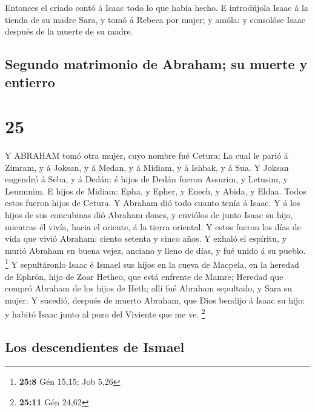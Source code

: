  Entonces el criado contó á Isaac todo lo que había hecho.
 E introdújola Isaac á la tienda de su madre Sara, y tomó á
Rebeca por mujer; y amóla: y consolóse Isaac después de la muerte de su
madre.

\hypertarget{segundo-matrimonio-de-abraham-su-muerte-y-entierro}{%
\subsection{Segundo matrimonio de Abraham; su muerte y
entierro}\label{segundo-matrimonio-de-abraham-su-muerte-y-entierro}}

\hypertarget{section-24}{%
\section{25}\label{section-24}}

 Y ABRAHAM tomó otra mujer, cuyo nombre fué Cetura;
 La cual le parió á Zimram, y á Joksan, y á Medan, y á
Midiam, y á Ishbak, y á Sua.  Y Joksan engendró á Seba, y á
Dedán: é hijos de Dedán fueron Assurim, y Letusim, y Leummim.
 E hijos de Midiam: Epha, y Epher, y Enech, y Abida, y
Eldaa. Todos estos fueron hijos de Cetura.  Y Abraham dió
todo cuanto tenía á Isaac.  Y á los hijos de sus concubinas
dió Abraham dones, y enviólos de junto Isaac su hijo, mientras él vivía,
hacia el oriente, á la tierra oriental.  Y estos fueron los
días de vida que vivió Abraham: ciento setenta y cinco años.
 Y exhaló el espíritu, y murió Abraham en buena vejez,
anciano y lleno de días, y fué unido á su pueblo. \footnote{\textbf{25:8}
  Gén 15,15; Job 5,26}  Y sepultáronlo Isaac é Ismael sus
hijos en la cueva de Macpela, en la heredad de Ephrón, hijo de Zoar
Hetheo, que está enfrente de Mamre;  Heredad que compró
Abraham de los hijos de Heth; allí fué Abraham sepultado, y Sara su
mujer.  Y sucedió, después de muerto Abraham, que Dios
bendijo á Isaac su hijo: y habitó Isaac junto al pozo del Viviente que
me ve. \footnote{\textbf{25:11} Gén 24,62}

\hypertarget{los-descendientes-de-ismael}{%
\subsection{Los descendientes de
Ismael}\label{los-descendientes-de-ismael}}

